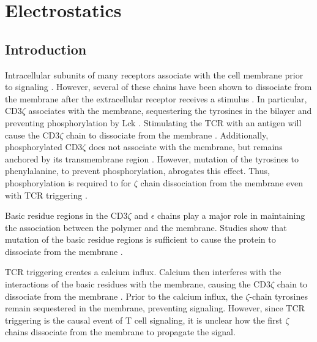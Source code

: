 \documentclass[../../AdvancementSummary.tex]{subfiles}
\begin{document}
\section{Electrostatics}

\subsection{Introduction}

Intracellular subunits of many receptors associate with the cell membrane prior to signaling \cite{Xu2008, Shi2013, Zhang2011, Dobbins2016}. 
However, several of these chains have been shown to dissociate from the membrane after the extracellular receptor receives a stimulus \cite{Zhang2011, Dobbins2016}.
In particular, CD3$\zeta$ associates with the membrane, sequestering the tyrosines in the bilayer and preventing phosphorylation by Lck \cite{Aivazian2000, Zhang2011, Shi2013}.
Stimulating the TCR with an antigen will cause the CD3$\zeta$ chain to dissociate from the membrane \cite{Zhang2011}.
Additionally, phosphorylated CD3$\zeta$ does not associate with the membrane, but remains anchored by its transmembrane region  \cite{Aivazian2000, Zhang2011}.
However, mutation of the tyrosines to phenylalanine, to prevent phosphorylation, abrogates this effect. Thus, phosphorylation is required to for $\zeta$ chain dissociation from the membrane even with TCR triggering  \cite{Zhang2011}.

Basic residue regions in the CD3$\zeta$ and $\epsilon$ chains play a major role in maintaining the association between the polymer and the membrane.
Studies show that mutation of the basic residue regions is sufficient to cause the protein to dissociate from the membrane \cite{Zhang2011}.

TCR triggering creates a calcium influx. Calcium then interferes with the interactions of the basic residues with the membrane, causing the CD3$\zeta$ chain to dissociate from the membrane \cite{Shi2013}. Prior to the calcium influx, the $\zeta$-chain tyrosines remain sequestered in the membrane, preventing signaling. However, since TCR triggering is the causal event of T cell signaling, it is unclear how the first $\zeta$ chains dissociate from the membrane to propagate the signal. 
\end{document}
